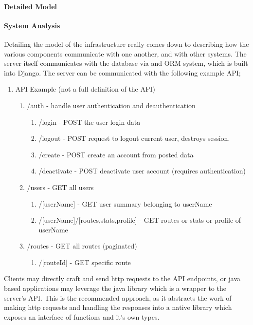 \documentclass{article}
\begin{document}
\paragraph{Detailed Model}
\paragraph{System Analysis}
Detailing the model of the infrastructure really comes down to describing how the
various components communicate with one another, and with other systems.
The server itself communicates with the database via and ORM system, which is built into
Django. The server can be communicated with the following example API;

\begin{enumerate}
  \item API Example (not a full definition of the API)
    \begin{enumerate}
      \item /auth - handle user authentication and deauthentication
        \begin{enumerate}
          \item /login - POST the user login data
          \item /logout - POST request to logout current user, destroys session.
          \item /create - POST create an account from posted data
          \item /deactivate - POST deactivate user account (requires authentication)
        \end{enumerate}
      \item /users - GET all users
        \begin{enumerate}
          \item /[userName] - GET user summary belonging to userName
          \item /[userName]/[routes,stats,profile] - GET routes or stats or profile of userName
        \end{enumerate}
      \item /routes - GET all routes (paginated)
        \begin{enumerate}
          \item /[routeId] - GET specific route
        \end{enumerate}
    \end{enumerate}
\end{enumerate}

Clients may directly craft and send http requests to the API endpoints, or java based
applications may leverage the java library which is a wrapper to the server's API. This is
the recommended approach, as it abstracts the work of making http requests and handling the
responses into a native library which exposes an interface of functions and it's own types.
\end{document}
